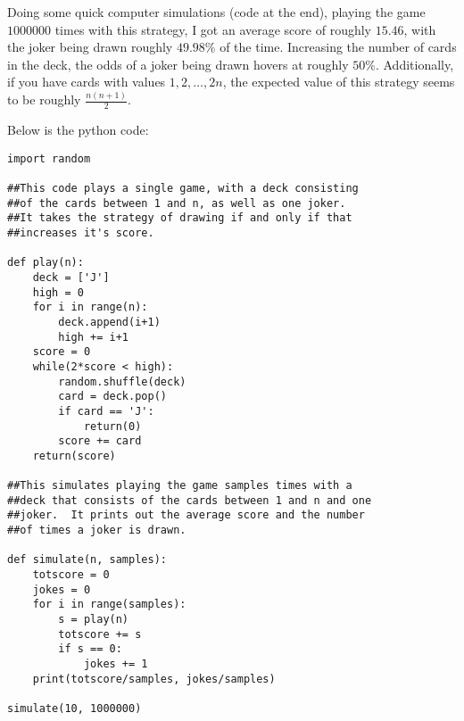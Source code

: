 \documentclass[11pt]{article}
\theoremstyle{definition}
\begin{document}
Doing some quick computer simulations (code at the end), playing the game $1000000$ times with this strategy, I got an average score of roughly $15.46$, with the joker being drawn roughly $49.98\%$ of the time.  Increasing the number of cards in the deck, the odds of a joker being drawn hovers at roughly $50\%$.  Additionally, if you have cards with values $1, 2, \ldots, 2n$, the expected value of this strategy seems to be roughly $\frac{n(n+1)}{2}$.

Below is the python code:
\begin{verbatim}import random

##This code plays a single game, with a deck consisting
##of the cards between 1 and n, as well as one joker.
##It takes the strategy of drawing if and only if that
##increases it's score.

def play(n):
    deck = ['J']
    high = 0
    for i in range(n):
        deck.append(i+1)
        high += i+1
    score = 0
    while(2*score < high):
        random.shuffle(deck)
        card = deck.pop()
        if card == 'J':
            return(0)
        score += card
    return(score)

##This simulates playing the game samples times with a
##deck that consists of the cards between 1 and n and one
##joker.  It prints out the average score and the number
##of times a joker is drawn.

def simulate(n, samples):
    totscore = 0
    jokes = 0
    for i in range(samples):
        s = play(n)
        totscore += s
        if s == 0:
            jokes += 1
    print(totscore/samples, jokes/samples)

simulate(10, 1000000)\end{verbatim}
\end{document}
